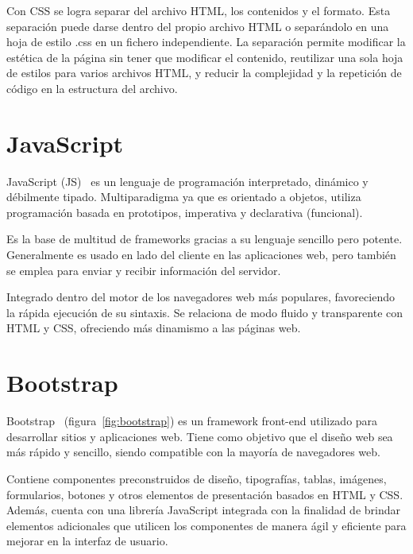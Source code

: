 \documentclass[a4paper, 12pt]{book}
\begin{document}
\vspace{5mm}
Con CSS se logra separar del archivo HTML, los contenidos y el formato.
Esta separación puede darse dentro del propio archivo HTML o separándolo en una hoja de estilo .css en un fichero independiente. 
La separación permite modificar la estética de la página sin tener que modificar el contenido, reutilizar una sola hoja de estilos para varios archivos HTML, y reducir la complejidad y la repetición de código en la estructura del archivo.


\section{JavaScript} 
\label{sec:javascript}

JavaScript (JS)~\cite{} es un lenguaje de programación interpretado, dinámico y débilmente tipado.
Multiparadigma ya que es orientado a objetos, utiliza programación basada en prototipos, imperativa y declarativa (funcional).

\vspace{5mm}
Es la base de multitud de frameworks gracias a su lenguaje sencillo pero potente. 
Generalmente es usado en lado del cliente en las aplicaciones web, pero también se emplea para enviar y recibir información del servidor.

\vspace{5mm}
Integrado dentro del motor de los navegadores web más populares, favoreciendo la rápida ejecución de su sintaxis.
Se relaciona de modo fluido y transparente con HTML y CSS, ofreciendo más dinamismo a las páginas web.


\section{Bootstrap} 
\label{sec:bootstrap}

Bootstrap~\cite{bootstrap} (figura~\ref{fig:bootstrap}) es un framework front-end utilizado para desarrollar sitios y aplicaciones web.
Tiene como objetivo que el diseño web sea más rápido y sencillo, siendo compatible con la mayoría de navegadores web.

\vspace{5mm}
Contiene componentes preconstruidos de diseño, tipografías, tablas, imágenes, formularios, botones y otros elementos de presentación basados en HTML y CSS.
Además, cuenta con una librería JavaScript integrada con la finalidad de brindar elementos adicionales que utilicen los componentes de manera ágil y eficiente para mejorar en la interfaz de usuario.
\end{document}
